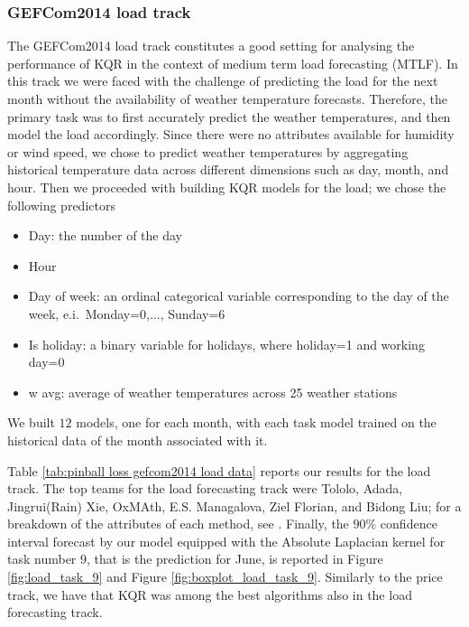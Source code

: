 \subsubsection{GEFCom2014 load track} 
The GEFCom2014 load track constitutes a good setting for analysing the performance of KQR in the context of medium term load forecasting (MTLF).
In this track we were faced with the challenge of predicting the load for the next month without the availability of weather temperature forecasts. 
Therefore, the primary task was to first accurately predict the weather temperatures, and then model the load accordingly. Since there were no attributes available for humidity or wind speed, we chose to predict weather temperatures by aggregating historical temperature data across different dimensions such as day, month, and hour. Then we proceeded with building KQR models for the load; we chose the following predictors
\begin{itemize}
    \item Day: the number of the day
    \item Hour
    \item Day of week: an ordinal categorical variable corresponding to the day of the week, e.i.\ Monday=0,$\dots$, Sunday=6
    \item Is holiday: a binary variable for holidays, where holiday=1 and working day=0
    \item w avg: average of weather temperatures across 25 weather stations
\end{itemize}
We built $12$ models, one for each month, with each task model trained on the historical data of the month associated with it.

Table \ref{tab:pinball loss gefcom2014 load data} reports our results for the load track. The top teams for the load forecasting track were Tololo, Adada, Jingrui(Rain) Xie, OxMAth, E.S. Managalova, Ziel Florian, and Bidong Liu; for a breakdown of the attributes of each method, see \cite[Table 6]{hong2016probabilistic}.
Finally, the $90\%$ confidence interval forecast by our model equipped with the Absolute Laplacian kernel for task number $9$, that is the prediction for June, is reported in Figure \ref{fig:load_task_9} and Figure \ref{fig:boxplot_load_task_9}.
Similarly to the price track, we have that KQR was among the best algorithms also in the load forecasting track.

